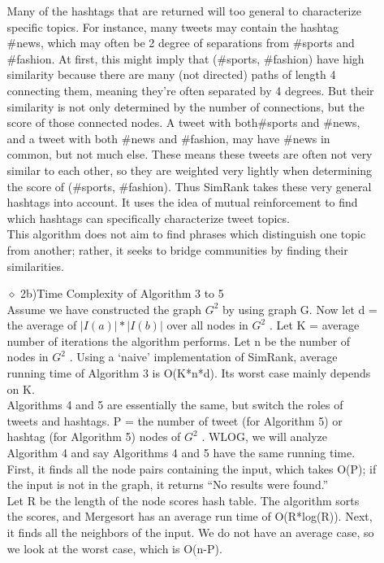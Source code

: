 \documentclass[10pt]{article}
\begin{document}
\begin{itemize}
\begin{itemize}
Many of the hashtags that are returned will too general to characterize specific topics. For instance, many tweets may contain the hashtag \#news, which may often be 2 degree of separations from \#sports and \#fashion. At first, this might imply that (\#sports, \#fashion) have high similarity because there are many (not directed) paths of length 4 connecting them, meaning they're often separated by 4 degrees. But their similarity is not only determined by the number of connections, but the score of those connected nodes. A tweet with both\#sports and \#news, and a tweet with both \#news and \#fashion, may have \#news in common, but not much else. These means these tweets are often not very similar to each other, so they are weighted very lightly when determining the score of (\#sports, \#fashion). Thus SimRank takes these very general hashtags into account. It uses the idea of mutual reinforcement to find which hashtags can specifically characterize tweet topics. \\

This algorithm does not aim to find phrases which distinguish one topic from another; rather, it seeks to bridge communities by finding their similarities. \\

\item[$\diamond$]{2b)Time Complexity of Algorithm 3 to 5}\\

Assume we have constructed the graph $ G^2$  by using graph G. Now let d = the average of $|I(a)|*|I(b)|$ over all nodes in $ G^2$ . Let K = average number of iterations the algorithm performs. Let n be the number of nodes in $ G^2$ . Using a ‘naive’ implementation of SimRank, average running time of Algorithm 3 is O(K*n*d). Its worst case mainly depends on K. \\

Algorithms 4 and 5 are essentially the same, but switch the roles of tweets and hashtags. P = the number of tweet (for Algorithm 5) or hashtag (for Algorithm 5) nodes of $ G^2$ . WLOG, we will analyze Algorithm 4 and say Algorithms 4 and 5 have the same running time. First, it finds all the node pairs containing the input, which takes O(P); if the input is not in the graph, it returns “No results were found.” \\

Let R be the length of the node scores hash table. The algorithm sorts the scores, and Mergesort has an average run time of O(R*log(R)). Next, it finds all the neighbors of the input. We do not have an average case, so we look at the worst case, which is O(n-P). \\


\end{itemize}
\end{itemize}
\end{document}
